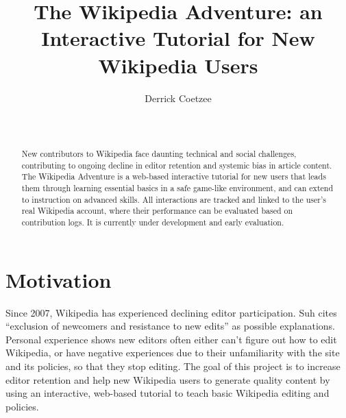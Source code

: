 \documentclass{acm_proc_article-sp}
\begin{document}
\title{The Wikipedia Adventure: an Interactive Tutorial for New Wikipedia Users}

\author{
\alignauthor
Derrick Coetzee \\
       \\
       \\
}

\maketitle
\begin{abstract}
New contributors to Wikipedia face daunting technical and social challenges, contributing to ongoing decline in editor retention and systemic bias in article content. The Wikipedia Adventure is a web-based interactive tutorial for new users that leads them through learning essential basics in a safe game-like environment, and can extend to instruction on advanced skills. All interactions are tracked and linked to the user's real Wikipedia account, where their performance can be evaluated based on contribution logs. It is currently under development and early evaluation.
\end{abstract}


\section{Motivation}
Since 2007, Wikipedia has experienced declining editor participation. Suh\cite{Suh:2009} cites ``exclusion of newcomers and resistance to new edits'' as possible explanations. Personal experience shows new editors often either can't figure out how to edit Wikipedia, or have negative experiences due to their unfamiliarity with the site and its policies, so that they stop editing. The goal of this project is to increase editor retention and help new Wikipedia users to generate quality content by using an interactive, web-based tutorial to teach basic Wikipedia editing and policies.
\end{document}
